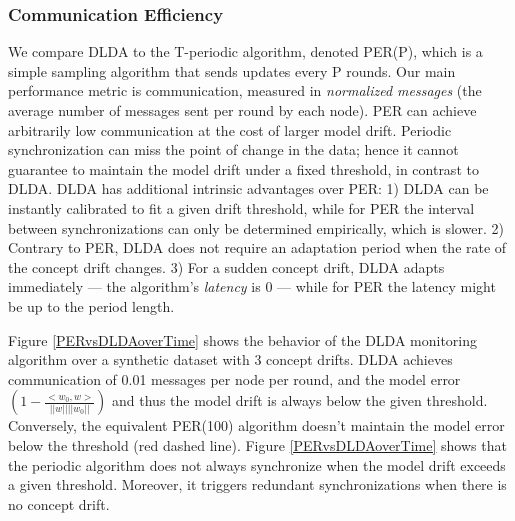 \subsubsection{Communication Efficiency}\label{sec:com_eff}
We compare DLDA to the T-periodic algorithm, denoted
PER(P), which is a simple sampling algorithm that sends updates
every P rounds.
Our main performance metric is communication, measured
in \textit{normalized messages} (the average number of messages sent per
round by each node). PER can achieve arbitrarily low communication at the cost of larger model drift. Periodic synchronization can miss the point of change in the data; hence it cannot guarantee to maintain the model drift under a fixed threshold, in contrast to DLDA.  DLDA has additional intrinsic advantages over PER: 1) DLDA can be instantly calibrated to fit a given drift threshold, while for PER the interval between synchronizations can only be determined empirically, which is slower. 2) Contrary to PER, DLDA does not require an adaptation period when the rate of the concept drift changes. 3) For a sudden concept drift, DLDA adapts immediately --- the algorithm's \textit{latency} is 0 --- while for PER the latency might be up to the period length.
	
Figure \ref{PERvsDLDAoverTime} shows the behavior of the DLDA monitoring
algorithm over a synthetic dataset with 3 concept drifts.
DLDA achieves communication of 0.01 messages per node per round, and
the model error $(1 - \frac{<w_0,w>}{||w||||w_0||})$ and thus the model drift  is always below the given threshold.
Conversely, the equivalent PER(100) algorithm doesn't maintain the
model error below the threshold (red dashed line).
Figure \ref{PERvsDLDAoverTime} shows that the periodic algorithm does not always  synchronize when the model drift exceeds a given threshold. Moreover, it  triggers redundant synchronizations when there is no concept drift.

